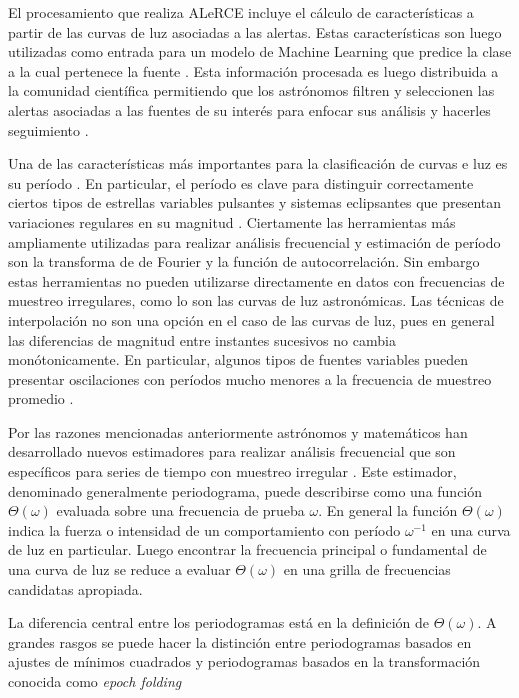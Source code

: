 El procesamiento que realiza ALeRCE incluye el cálculo de características a partir de las curvas de luz asociadas a las alertas. Estas características son luego utilizadas como entrada para un modelo de Machine Learning que predice la clase a la cual pertenece la fuente \cite{lightcurve-classifier}. Esta información procesada es luego distribuida a la comunidad científica permitiendo que los astrónomos filtren y seleccionen las alertas asociadas a las fuentes de su interés para enfocar sus análisis y hacerles seguimiento \cite{alerce-intro}.

Una de las características más importantes para la clasificación de curvas e luz es su período \cite{lightcurve-classifier}. En particular, el período es clave para distinguir correctamente ciertos tipos de estrellas variables pulsantes \cite{catelan2014pulsating} y sistemas eclipsantes que presentan variaciones regulares en su magnitud \cite{percy2007understanding}. Ciertamente las herramientas más ampliamente utilizadas para realizar análisis frecuencial y estimación de período son la transforma de de Fourier y la función de autocorrelación. Sin embargo estas herramientas no pueden utilizarse directamente en datos con frecuencias de muestreo irregulares, como lo son las curvas de luz astronómicas. Las técnicas de interpolación no son una opción en el caso de las curvas de luz, pues en general las diferencias de magnitud entre instantes sucesivos no cambia monótonicamente. En particular, algunos tipos de fuentes variables pueden presentar oscilaciones con períodos mucho menores a la frecuencia de muestreo promedio \cite{eyer2008variable}.

Por las razones mencionadas anteriormente astrónomos y matemáticos han desarrollado nuevos estimadores para realizar análisis frecuencial que son específicos para series de tiempo con muestreo irregular \cite{scargle1982studies, schwarzenberg1989advantage, zechmeister2009generalised, graham-entropy}. Este estimador, denominado generalmente periodograma, puede describirse como una función $\Theta(\omega)$ evaluada sobre una frecuencia de prueba $\omega$. En general la función $\Theta(\omega)$ indica la fuerza o intensidad de un comportamiento con período $\omega^{-1}$ en una curva de luz en particular. Luego encontrar la frecuencia principal o fundamental de una curva de luz se reduce a evaluar $\Theta(\omega)$ en una grilla de frecuencias candidatas apropiada. 

La diferencia central entre los periodogramas está en la definición de $\Theta(\omega)$. A grandes rasgos se puede hacer la distinción entre periodogramas basados en ajustes de mínimos cuadrados \cite{scargle1982studies, zechmeister2009generalised} y periodogramas basados en la transformación conocida como \textit{epoch folding} \cite{schwarzenberg1989advantage, graham-entropy}

